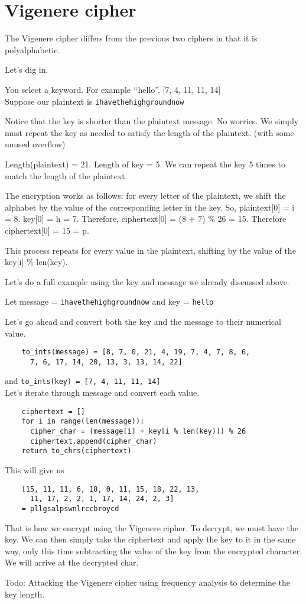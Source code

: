 \section{Vigenere cipher}

The Vigenere cipher differs from the previous two ciphers in that it is
polyalphabetic.

Let's dig in.

You select a keyword. For example \lq\lq hello''. [7, 4, 11, 11, 14] \\
Suppose our plaintext is \verb!ihavethehighgroundnow!

Notice that the key is shorter than the plaintext message. No worries.
We simply must repeat the key as needed to satisfy the length of the
plaintext. (with some unused overflow)

Length(plaintext) = 21. Length of key = 5. We can repeat the key 5 times
to match the length of the plaintext.

The encryption works as follows: for every letter of the plaintext, we
shift the alphabet by the value of the corresponding letter in the key.
So, plaintext[0] = i = 8. key[0] = h = 7. Therefore, ciphertext[0]
= (8 + 7) \% 26 = 15. Therefore ciphertext[0] = 15 = p.

This process repeats for every value in the plaintext, shifting by the
value of the key[i] \% len(key). 

\begin{ex} Let's do a full example using the key and message we already discussed above.
  
  Let
  message = \verb!ihavethehighgroundnow!
  and 
  key = \verb!hello!

  Let's go ahead and convert both the key and the message to their numerical
  value.
  \begin{Verbatim}
    to_ints(message) = [8, 7, 0, 21, 4, 19, 7, 4, 7, 8, 6,
      7, 6, 17, 14, 20, 13, 3, 13, 14, 22]
  \end{Verbatim}
  and \Verb!to_ints(key) = [7, 4, 11, 11, 14]! \\
  Let's iterate through message and convert each value.
  \begin{Verbatim}
    ciphertext = []
    for i in range(len(message)):
      cipher_char = (message[i] + key[i % len(key)]) % 26
      ciphertext.append(cipher_char)
    return to_chrs(ciphertext)
  \end{Verbatim}
  This will give us
  \begin{Verbatim}
    [15, 11, 11, 6, 18, 0, 11, 15, 18, 22, 13,
      11, 17, 2, 2, 1, 17, 14, 24, 2, 3]
    = pllgsalpswnlrccbroycd
  \end{Verbatim}
\end{ex}

That is how we encrypt using the Vigenere cipher.
To decrypt, we must have the key. We can then simply take the ciphertext
and apply the key to it in the same way, only this time subtracting the value
of the key from the encrypted character. We will arrive at the decrypted char.

Todo: Attacking the Vigenere cipher using frequency analysis to determine the
key length. 

